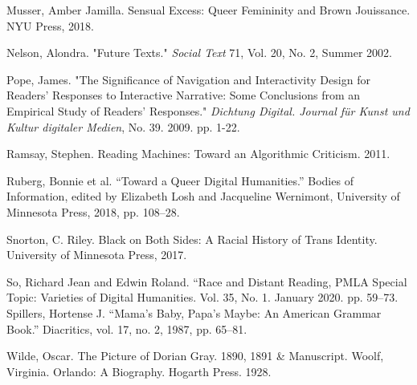 \documentclass[11pt]{article}
\begin{document}
Musser, Amber Jamilla. Sensual Excess: Queer Femininity and Brown
Jouissance. NYU Press, 2018.

Nelson, Alondra. "Future Texts." \emph{Social Text} 71, Vol. 20, No. 2,
Summer 2002.

Pope, James. "The Significance of Navigation and Interactivity Design
for Readers' Responses to Interactive Narrative: Some Conclusions from
an Empirical Study of Readers' Responses." \emph{Dichtung Digital. Journal
für Kunst und Kultur digitaler Medien}, No. 39. 2009. pp. 1-22.

Ramsay, Stephen. Reading Machines: Toward an Algorithmic
Criticism. 2011.

Ruberg, Bonnie et al. “Toward a Queer Digital Humanities.” Bodies of
Information, edited by Elizabeth Losh and Jacqueline Wernimont,
University of Minnesota Press, 2018, pp. 108–28.

Snorton, C. Riley. Black on Both Sides: A Racial History of Trans
Identity. University of Minnesota Press, 2017.

So, Richard Jean and Edwin Roland. “Race and Distant Reading, PMLA
Special Topic: Varieties of Digital Humanities. Vol. 35,
No. 1. January 2020. pp. 59–73.  Spillers, Hortense J. “Mama’s Baby,
Papa’s Maybe: An American Grammar Book.” Diacritics, vol. 17, no. 2,
1987, pp. 65–81.

Wilde, Oscar. The Picture of Dorian Gray. 1890, 1891 \& Manuscript.
Woolf, Virginia. Orlando: A Biography. Hogarth Press. 1928.
\end{document}
